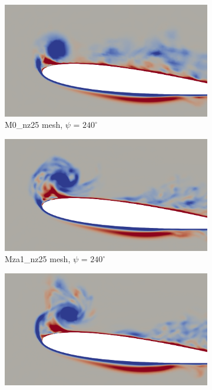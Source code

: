 \begin{figure}[H]
	\centering
	\begin{center}
		\begin{subfigure}[b]{0.475\textwidth}
		\centering
		\includegraphics[width=1\textwidth]{figures/zonal_adapt_results/vorticity_plots/v2/M0/spavg/phase_240.png}
		\caption{M0\_nz25 mesh, $\psi$ = $240^\circ$}
		\label{fig:M0_sp_psi240}
		\end{subfigure}
	\end{center}
	\begin{subfigure}[b]{0.475\textwidth}
		\centering
		\includegraphics[width=1\textwidth]{figures/zonal_adapt_results/vorticity_plots/v2/Mza1_25/spavg/phase_240.png}
		\caption{Mza1\_nz25 mesh, $\psi$ = $240^\circ$}
		\label{fig:Mza1_25_sp_psi240}
	\end{subfigure}
	\begin{subfigure}[b]{0.475\textwidth}
	\centering
	\includegraphics[width=1\textwidth]{figures/zonal_adapt_results/vorticity_plots/v2/Mza1_50/spavg/phase_240.png}

\end{subfigure}
\end{figure}
